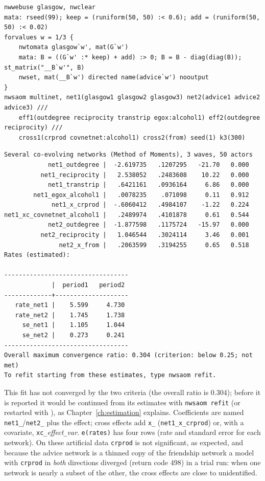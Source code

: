\begin{lstlisting}
nwwebuse glasgow, nwclear
mata: rseed(99); keep = (runiform(50, 50) :< 0.6); add = (runiform(50, 50) :< 0.02)
forvalues w = 1/3 {
    nwtomata glasgow`w', mat(G`w')
    mata: B = ((G`w' :* keep) + add) :> 0; B = B - diag(diag(B)); st_matrix("__B`w'", B)
    nwset, mat(__B`w') directed name(advice`w') nooutput
}
nwsaom multinet, net1(glasgow1 glasgow2 glasgow3) net2(advice1 advice2 advice3) ///
    eff1(outdegree reciprocity transtrip egox:alcohol1) eff2(outdegree reciprocity) ///
    cross1(crprod covnetnet:alcohol1) cross2(from) seed(1) k3(300)
\end{lstlisting}
\begin{lstlisting}
Several co-evolving networks (Method of Moments), 3 waves, 50 actors
            net1_outdegree |  -2.619735   .1207295   -21.70   0.000
          net1_reciprocity |   2.538052   .2483608    10.22   0.000
            net1_transtrip |   .6421161   .0936164     6.86   0.000
        net1_egox_alcohol1 |   .0078235    .071098     0.11   0.912
             net1_x_crprod |  -.6060412   .4984107    -1.22   0.224
net1_xc_covnetnet_alcohol1 |   .2489974   .4101878     0.61   0.544
            net2_outdegree |  -1.877598   .1175724   -15.97   0.000
          net2_reciprocity |   1.046544   .3024114     3.46   0.001
               net2_x_from |   .2063599   .3194255     0.65   0.518
Rates (estimated):

----------------------------------
             |  period1   period2
-------------+--------------------
   rate_net1 |    5.599     4.730
   rate_net2 |    1.745     1.738
     se_net1 |    1.105     1.044
     se_net2 |    0.273     0.241
----------------------------------
Overall maximum convergence ratio: 0.304 (criterion: below 0.25; not met)
To refit starting from these estimates, type nwsaom refit.
\end{lstlisting}
This fit has not converged by the two criteria (the overall ratio is 0.304); before it is reported it would be continued from its estimates with \texttt{nwsaom refit} (or restarted with ), as Chapter~\ref{ch:estimation} explains. Coefficients are named \texttt{net1\_}/\texttt{net2\_} plus the effect; cross effects add \texttt{x\_} (\texttt{net1\_x\_crprod}) or, with a covariate, \texttt{xc\_}\emph{effect}\texttt{\_}\emph{var}. \texttt{e(rates)} has four rows (rate and standard error for each network). On these artificial data \texttt{crprod} is not significant, as expected, and because the advice network is a thinned copy of the friendship network a model with \texttt{crprod} in \emph{both} directions diverged (return code 498) in a trial run: when one network is nearly a subset of the other, the cross effects are close to unidentified.

